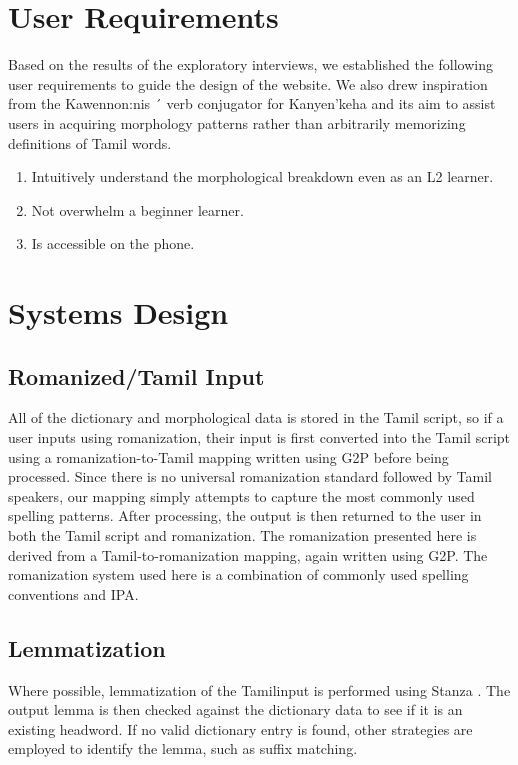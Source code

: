 \documentclass[11pt]{article}
\begin{document}
\section{User Requirements}
Based on the results of the exploratory interviews, we established the 
following user requirements to guide the design of the website. 
We also drew inspiration from the Kawennon:nis ´ verb conjugator for 
Kanyen'keha \citep{kazantseva_kawennonnis_2018} and its aim to 
assist users in acquiring morphology patterns rather than 
arbitrarily memorizing definitions of Tamil words. 
\begin{enumerate}
  \item Intuitively understand the morphological breakdown even as an L2 learner.
  \item Not overwhelm a beginner learner. 
  \item Is accessible on the phone. 
\end{enumerate}

\section{Systems Design}
\subsection{Romanized/Tamil Input}
All of the dictionary and morphological data is stored in the Tamil script, 
so if a user inputs using romanization, their input is first converted into 
the Tamil script using a romanization-to-Tamil mapping written using 
G2P \citep{pine_gi2pi_2022} before being processed. 
Since there is no universal romanization standard followed by Tamil speakers, 
our mapping simply attempts to capture the most commonly used spelling patterns. 
After processing, the output is then returned to the user in both the 
Tamil script and romanization. The romanization presented here is derived 
from a Tamil-to-romanization mapping, again written using G2P. 
The romanization system used here is a combination of commonly used 
spelling conventions and IPA.

\subsection{Lemmatization}
Where possible, lemmatization of the Tamilinput is performed using 
Stanza \citep{qi2020stanza}. The output lemma is then checked 
against the dictionary data to see if it is an existing headword. 
If no valid dictionary entry is found, other strategies are 
employed to identify the lemma, such as suffix matching.
\end{document}
